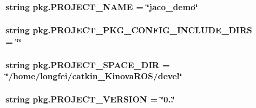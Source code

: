 \subsubsection[{\texorpdfstring{P\+R\+O\+J\+E\+C\+T\+\_\+\+N\+A\+ME}{PROJECT_NAME}}]{\setlength{\rightskip}{0pt plus 5cm}string pkg.\+P\+R\+O\+J\+E\+C\+T\+\_\+\+N\+A\+ME = \char`\"{}jaco\+\_\+demo\char`\"{}}\hypertarget{namespacepkg_a7dfbe99257c26f5e4a3a5483995d9ddc}{}\label{namespacepkg_a7dfbe99257c26f5e4a3a5483995d9ddc}
\subsubsection[{\texorpdfstring{P\+R\+O\+J\+E\+C\+T\+\_\+\+P\+K\+G\+\_\+\+C\+O\+N\+F\+I\+G\+\_\+\+I\+N\+C\+L\+U\+D\+E\+\_\+\+D\+I\+RS}{PROJECT_PKG_CONFIG_INCLUDE_DIRS}}]{\setlength{\rightskip}{0pt plus 5cm}string pkg.\+P\+R\+O\+J\+E\+C\+T\+\_\+\+P\+K\+G\+\_\+\+C\+O\+N\+F\+I\+G\+\_\+\+I\+N\+C\+L\+U\+D\+E\+\_\+\+D\+I\+RS = \char`\"{}\char`\"{}}\hypertarget{namespacepkg_a2760bf8266ff58da440f65ee91b203ab}{}\label{namespacepkg_a2760bf8266ff58da440f65ee91b203ab}
\subsubsection[{\texorpdfstring{P\+R\+O\+J\+E\+C\+T\+\_\+\+S\+P\+A\+C\+E\+\_\+\+D\+IR}{PROJECT_SPACE_DIR}}]{\setlength{\rightskip}{0pt plus 5cm}string pkg.\+P\+R\+O\+J\+E\+C\+T\+\_\+\+S\+P\+A\+C\+E\+\_\+\+D\+IR = \char`\"{}/home/longfei/catkin\+\_\+\+Kinova\+R\+OS/devel\char`\"{}}\hypertarget{namespacepkg_a3f0f1b4bc03c596525e025539ca4332f}{}\label{namespacepkg_a3f0f1b4bc03c596525e025539ca4332f}
\subsubsection[{\texorpdfstring{P\+R\+O\+J\+E\+C\+T\+\_\+\+V\+E\+R\+S\+I\+ON}{PROJECT_VERSION}}]{\setlength{\rightskip}{0pt plus 5cm}string pkg.\+P\+R\+O\+J\+E\+C\+T\+\_\+\+V\+E\+R\+S\+I\+ON = \char`\"{}0..\char`\"{}}\hypertarget{namespacepkg_ab1037914b9286bb61855131c06149648}{}\label{namespacepkg_ab1037914b9286bb61855131c06149648}
